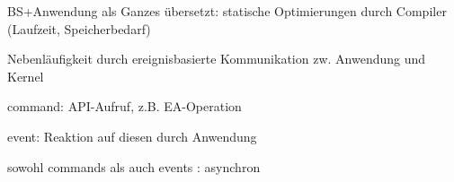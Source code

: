 \documentclass[a4paper]{article}
\begin{document}
\begin{multicols}{3}
\begin{itemize*}
        \begin{itemize*}
            \item BS+Anwendung als Ganzes übersetzt: statische Optimierungen durch Compiler (Laufzeit, Speicherbedarf)
            \item Nebenläufigkeit durch ereignisbasierte Kommunikation zw. Anwendung und Kernel
            \begin{itemize*}
                \item command: API-Aufruf, z.B. EA-Operation
                \item event: Reaktion auf diesen durch Anwendung
            \end{itemize*}
            \item sowohl commands als auch events : asynchron
        \end{itemize*}
    \end{itemize*}


\end{multicols}
\end{document}
